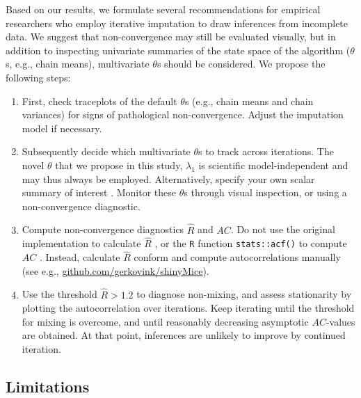 \documentclass[Royal,times,sageh]{sagej}
\begin{document}
Based on our results, we formulate several recommendations for empirical researchers who employ iterative imputation to draw inferences from incomplete data. We suggest that non-convergence may still be evaluated visually, but in addition to inspecting univariate summaries of the state space of the algorithm (\(\theta\)s, e.g., chain means), multivariate \(\theta\)s should be considered. We propose the following steps:

\begin{enumerate}
\def\labelenumi{\arabic{enumi}.}
\item
  First, check traceplots of the default \(\theta\)s (e.g., chain means and chain variances) for signs of pathological non-convergence. Adjust the imputation model if necessary.
\item
  Subsequently decide which multivariate \(\theta\)s to track across iterations. The novel \(\theta\) that we propose in this study, \(\lambda_1\) is scientific model-independent and may thus always be employed. Alternatively, specify your own scalar summary of interest \citep[see e.g.,][]{buur18}. Monitor these \(\theta\)s through visual inspection, or using a non-convergence diagnostic.
\item
  Compute non-convergence diagnostics \(\widehat{R}\) and \(AC\). Do not use the original implementation to calculate \(\widehat{R}\) \citep{gelm92}, or the \texttt{R} function \texttt{stats::acf()} to compute \(AC\) \citep{R}. Instead, calculate \(\widehat{R}\) conform \citet{veht19} and compute autocorrelations manually (see e.g., \href{https://github.com/gerkovink/shinyMice/tree/master/3.Thesis/}{github.com/gerkovink/shinyMice}).
\item
  Use the threshold \(\widehat{R}>1.2\) to diagnose non-mixing, and assess stationarity by plotting the autocorrelation over iterations. Keep iterating until the threshold for mixing is overcome, and until reasonably decreasing asymptotic \(AC\)-values are obtained. At that point, inferences are unlikely to improve by continued iteration.
\end{enumerate}

\hypertarget{limitations}{%
\subsection{Limitations}\label{limitations}}
\end{document}
